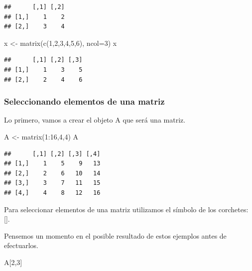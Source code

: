 \documentclass[
]{book}
\newenvironment{Shaded}{\begin{snugshade}}{\end{snugshade}}
\newcommand{\AttributeTok}[1]{\textcolor[rgb]{0.77,0.63,0.00}{#1}}
\newcommand{\DecValTok}[1]{\textcolor[rgb]{0.00,0.00,0.81}{#1}}
\newcommand{\FunctionTok}[1]{\textcolor[rgb]{0.00,0.00,0.00}{#1}}
\newcommand{\NormalTok}[1]{#1}
\newcommand{\OtherTok}[1]{\textcolor[rgb]{0.56,0.35,0.01}{#1}}
\newcommand{\SpecialCharTok}[1]{\textcolor[rgb]{0.00,0.00,0.00}{#1}}
\begin{document}
\begin{verbatim}
##      [,1] [,2]
## [1,]    1    2
## [2,]    3    4
\end{verbatim}

\begin{Shaded}
\begin{Highlighting}[]
\NormalTok{x }\OtherTok{\textless{}{-}} \FunctionTok{matrix}\NormalTok{(}\FunctionTok{c}\NormalTok{(}\DecValTok{1}\NormalTok{,}\DecValTok{2}\NormalTok{,}\DecValTok{3}\NormalTok{,}\DecValTok{4}\NormalTok{,}\DecValTok{5}\NormalTok{,}\DecValTok{6}\NormalTok{), }\AttributeTok{ncol=}\DecValTok{3}\NormalTok{)}
\NormalTok{x}
\end{Highlighting}
\end{Shaded}

\begin{verbatim}
##      [,1] [,2] [,3]
## [1,]    1    3    5
## [2,]    2    4    6
\end{verbatim}

\hypertarget{seleccionando-elementos-de-una-matriz}{%
\subsubsection{Seleccionando elementos de una matriz}\label{seleccionando-elementos-de-una-matriz}}

Lo primero, vamos a crear el objeto A que será una matriz.

\begin{Shaded}
\begin{Highlighting}[]
\NormalTok{A }\OtherTok{\textless{}{-}} \FunctionTok{matrix}\NormalTok{(}\DecValTok{1}\SpecialCharTok{:}\DecValTok{16}\NormalTok{,}\DecValTok{4}\NormalTok{,}\DecValTok{4}\NormalTok{)}
\NormalTok{A}
\end{Highlighting}
\end{Shaded}

\begin{verbatim}
##      [,1] [,2] [,3] [,4]
## [1,]    1    5    9   13
## [2,]    2    6   10   14
## [3,]    3    7   11   15
## [4,]    4    8   12   16
\end{verbatim}

Para seleccionar elementos de una matriz utilizamos el símbolo de los corchetes: {[}{]}.

Pensemos un momento en el posible resultado de estos ejemplos antes de efectuarlos.

\begin{Shaded}
\begin{Highlighting}[]
\NormalTok{A[}\DecValTok{2}\NormalTok{,}\DecValTok{3}\NormalTok{]}
\end{Highlighting}
\end{Shaded}
\end{document}
